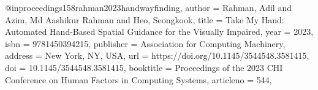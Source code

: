 @inproceedings{158rahman2023handwayfinding,
author = {Rahman, Adil and Azim, Md Aashikur Rahman and Heo, Seongkook},
title = {Take My Hand: Automated Hand-Based Spatial Guidance for the Visually Impaired},
year = {2023},
isbn = {9781450394215},
publisher = {Association for Computing Machinery},
address = {New York, NY, USA},
url = {https://doi.org/10.1145/3544548.3581415},
doi = {10.1145/3544548.3581415},
booktitle = {Proceedings of the 2023 CHI Conference on Human Factors in Computing Systems},
articleno = {544},
}